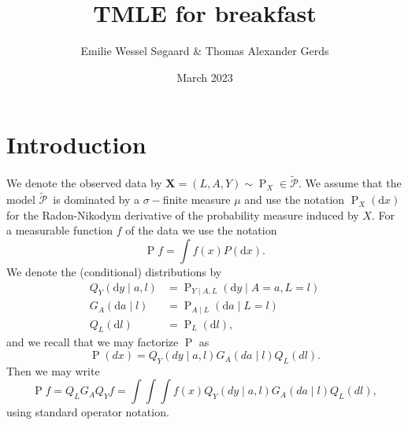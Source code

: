 \documentclass{article}
\title{TMLE for breakfast}
\author{Emilie Wessel S{\o}gaard \& Thomas Alexander Gerds}
\date{March 2023}
\newcommand{\modelx}{\ensuremath{\tilde{\mathcal{P}}}}
\renewcommand{\P}{\ensuremath{\operatorname{P}}}
\renewcommand{\d}{\ensuremath{\mathrm{d}}}
\begin{document}
\maketitle

\section{Introduction}
We denote the observed data by $\textbf{X}=(L,A,Y)\sim \P_X\in\modelx $. We assume that the model \modelx\ is dominated by a \(\sigma-\)finite measure $\mu$ and use the notation \(\P_X(\d x)\) for the Radon-Nikodym derivative of the probability measure induced by \(X\). For a measurable function \(f\) of the data we use the notation 
$$\P f=\int f(x)P(\d x).$$ 
We denote the (conditional) distributions by
\begin{align*}
    Q_Y(\d y\mid a,l)&=\P_{Y\mid A, L}(\d y\mid A=a, L = l)\\
    G_A(\d a\mid l)&=\P_{A\mid L}(\d a\mid L = l)\\
    Q_L(\d l)&=\P_L(\d l),
\end{align*}
and we recall that we may factorize $\P$ as 
$$\P(dx)=Q_Y(dy\mid a,l)G_A(da\mid l)Q_L(dl).$$
Then we may write 
$$\P f=Q_LG_AQ_Yf=\int\int\int f(x)Q_Y(dy\mid a,l)G_A(da\mid l)Q_L(dl),$$
using standard operator notation.
\end{document}
